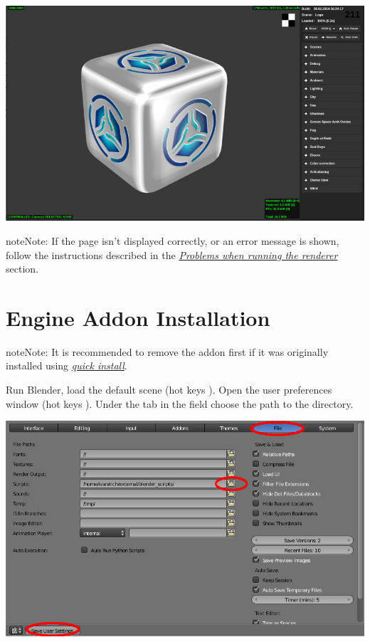 \documentclass[a4paper,12pt,oneside]{sphinxmanual}
\begin{document}
{\hfill\includegraphics[width=1.000\linewidth]{default_page.jpg}\hfill}

\begin{DUlineblock}{0em}
\item[] 
\end{DUlineblock}

\begin{notice}{note}{Note:}
If the page isn't displayed correctly, or an error message is shown, follow the instructions described in the {\hyperref[problems_and_solutions:renderer-not-working]{\emph{Problems when running the renderer}}} section.
\end{notice}


\section{Engine Addon Installation}
\label{setup:getting-started-addon}\label{setup:id7}\label{setup:index-2}
\begin{notice}{note}{Note:}
It is recommended to remove the addon first if it was originally installed using {\hyperref[first_steps:quick-install]{\emph{quick install}}}.
\end{notice}

Run Blender, load the default scene  (hot keys ). Open the user preferences window  (hot keys ). Under the  tab in the  field choose the path to the  directory.

{\hfill\includegraphics[width=1.000\linewidth]{user_preferences_scripts_path.jpg}\hfill}
\end{document}
